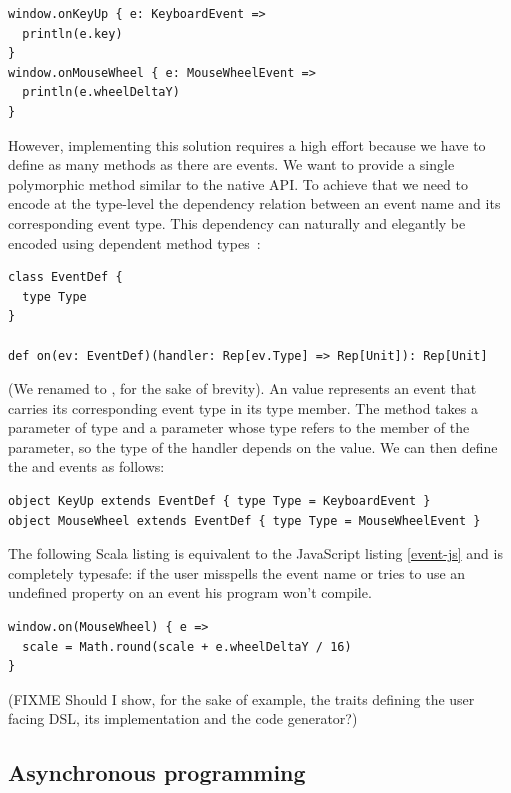 \documentclass[american,english,runningheads]{llncs}
\begin{document}
\begin{lstlisting}
window.onKeyUp { e: KeyboardEvent =>
  println(e.key)
}
window.onMouseWheel { e: MouseWheelEvent =>
  println(e.wheelDeltaY)
}
\end{lstlisting}

However, implementing this solution requires a high effort because we have to define as many methods as there are events. We want to provide a single polymorphic method similar to the native API. To achieve that we need to encode at the type-level the dependency relation between an event name and its corresponding event type. This dependency can naturally and elegantly be encoded using dependent method types~\cite{Oliveira10_Typeclasses}:

\begin{lstlisting}
class EventDef {
  type Type
}

def on(ev: EventDef)(handler: Rep[ev.Type] => Rep[Unit]): Rep[Unit]
\end{lstlisting}

(We renamed  to , for the sake of brevity). An  value represents an event that carries its corresponding event type in its  type member. The  method takes a parameter  of type  and a  parameter whose type refers to the  member of the  parameter, so the type of the handler depends on the  value. We can then define the  and  events as follows:

\begin{lstlisting}
object KeyUp extends EventDef { type Type = KeyboardEvent }
object MouseWheel extends EventDef { type Type = MouseWheelEvent }
\end{lstlisting}

The following Scala listing is equivalent to the JavaScript listing \ref{event-js} and is completely typesafe: if the user misspells the event name or tries to use an undefined property on an event his program won’t compile.

\begin{lstlisting}
window.on(MouseWheel) { e =>
  scale = Math.round(scale + e.wheelDeltaY / 16)
}
\end{lstlisting}

(FIXME Should I show, for the sake of example, the traits defining the user facing DSL, its implementation and the code generator?)

\subsection{Asynchronous programming}
\end{document}
